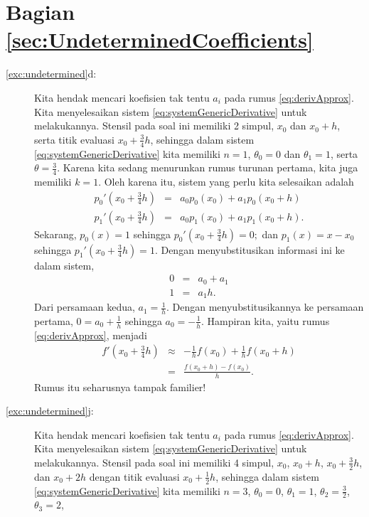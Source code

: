 \section*{Bagian \ref{sec:UndeterminedCoefficients}}
\begin{description}
\item [{\ref{exc:undetermined}d:}] Kita hendak mencari koefisien tak tentu
$a_{i}$ pada rumus \ref{eq:derivApprox}. Kita menyelesaikan sistem
\ref{eq:systemGenericDerivative} untuk melakukannya. Stensil pada
soal ini memiliki 2 simpul, $x_{0}$ dan $x_{0}+h$, serta titik evaluasi
$x_{0}+\frac{3}{4}h$, sehingga dalam sistem \ref{eq:systemGenericDerivative}
kita memiliki $n=1$, $\theta_{0}=0$ dan $\theta_{1}=1$, serta $\theta=\frac{3}{4}$.
Karena kita sedang menurunkan rumus turunan pertama, kita juga memiliki
$k=1$. Oleh karena itu, sistem yang perlu kita selesaikan adalah
\begin{eqnarray*}
p_{0}'\left(x_{0}+\frac{3}{4}h\right) & = & a_{0}p_{0}(x_{0})+a_{1}p_{0}(x_{0}+h)\\
p_{1}'\left(x_{0}+\frac{3}{4}h\right) & = & a_{0}p_{1}(x_{0})+a_{1}p_{1}(x_{0}+h).
\end{eqnarray*}
Sekarang, $p_{0}(x)=1$ sehingga $p_{0}'(x_{0}+\frac{3}{4}h)=0;$
dan $p_{1}(x)=x-x_{0}$ sehingga $p_{1}'(x_{0}+\frac{3}{4}h)=1$.
Dengan menyubstitusikan informasi ini ke dalam sistem,
\begin{eqnarray*}
0 & = & a_{0}+a_{1}\\
1 & = & a_{1}h.
\end{eqnarray*}
Dari persamaan kedua, $a_{1}=\frac{1}{h}$. Dengan menyubstitusikannya
ke persamaan pertama, $0=a_{0}+\frac{1}{h}$ sehingga $a_{0}=-\frac{1}{h}$.
Hampiran kita, yaitu rumus \ref{eq:derivApprox}, menjadi
\begin{eqnarray*}
f'\left(x_{0}+\frac{3}{4}h\right) & \approx & -\frac{1}{h}f(x_{0})+\frac{1}{h}f(x_{0}+h)\\
 & = & \frac{f(x_{0}+h)-f(x_{0})}{h}.
\end{eqnarray*}
Rumus itu seharusnya tampak familier!
\item [{\ref{exc:undetermined}j:}] Kita hendak mencari koefisien tak tentu
$a_{i}$ pada rumus \ref{eq:derivApprox}. Kita menyelesaikan sistem
\ref{eq:systemGenericDerivative} untuk melakukannya. Stensil pada
soal ini memiliki 4 simpul, $x_{0}$, $x_{0}+h$, $x_{0}+\frac{3}{2}h$,
dan $x_{0}+2h$ dengan titik evaluasi $x_{0}+\frac{1}{2}h$, sehingga
dalam sistem \ref{eq:systemGenericDerivative} kita memiliki $n=3$,
$\theta_{0}=0$, $\theta_{1}=1$, $\theta_{2}=\frac{3}{2}$, $\theta_{3}=2$,

\end{description}

